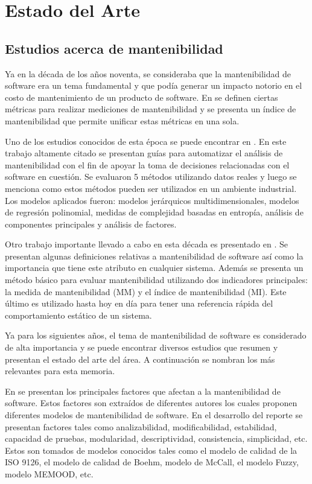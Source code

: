 \section{Estado del Arte}
\subsection{Estudios acerca de mantenibilidad}

Ya en la década de los años noventa, se consideraba que la mantenibilidad
de software era un tema fundamental y que podía generar un impacto notorio
en el costo de mantenimiento de un producto de software. En \cite{Oman:1992}
se definen ciertas métricas para realizar mediciones de mantenibilidad y se
presenta un índice de mantenibilidad que permite unificar estas métricas en
una sola.

Uno de los estudios conocidos de esta época se puede encontrar en \cite{Coleman:1996}.
En este trabajo altamente citado se presentan guías  para automatizar el análisis de
mantenibilidad con el fin de apoyar la toma de decisiones relacionadas con el
software en cuestión. Se evaluaron 5 métodos utilizando datos reales y luego
se menciona como estos métodos pueden ser utilizados en un ambiente industrial.
Los modelos aplicados fueron: modelos jerárquicos multidimensionales, modelos
de regresión polinomial, medidas de complejidad basadas en entropía, análisis
de componentes principales y análisis de factores.

Otro trabajo importante llevado a cabo en esta década es
presentado en \cite{West:1996}. Se presentan algunas definiciones
relativas a mantenibilidad de software así como la importancia que tiene
este atributo en cualquier sistema. Además se presenta un método básico
para evaluar mantenibilidad utilizando dos indicadores principales: la
medida de mantenibilidad (MM) y el índice de mantenibilidad (MI). Este último
es utilizado hasta hoy en día para tener una referencia rápida del comportamiento
estático de un sistema. 

Ya para los siguientes años, el tema de mantenibilidad de software es considerado
de alta importancia y se puede encontrar diversos estudios que resumen y presentan
el estado del arte del área. A continuación se nombran los más relevantes
para esta memoria.

En \cite{survey} se presentan los principales factores que afectan a la mantenibilidad de
software. Estos factores son extraídos de diferentes autores los cuales 
proponen diferentes modelos de mantenibilidad de software.
En el desarrollo del reporte se presentan factores tales como 
analizabilidad, modificabilidad, estabilidad, capacidad de pruebas, modularidad,
descriptividad, consistencia, simplicidad, etc. Estos son tomados de modelos
conocidos tales como el modelo de calidad de la ISO 9126, el modelo de calidad
de Boehm, modelo de McCall, el modelo Fuzzy, modelo MEMOOD, etc.

